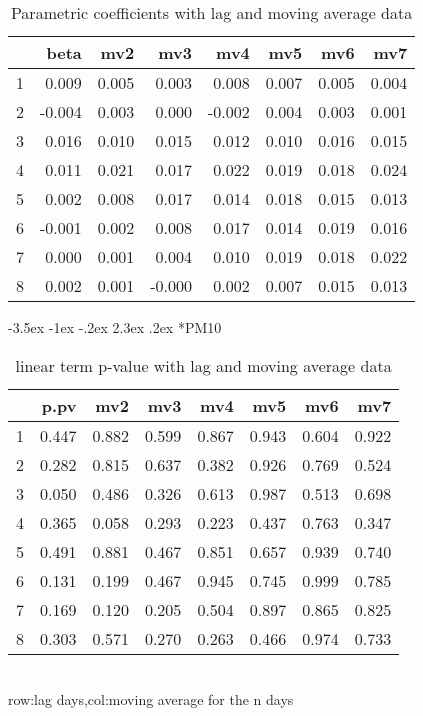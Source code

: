 \documentclass[a4paper, 12pt]{article}
\makeatletter
\def\large{\fontsize{14}{20}\selectfont}
\renewcommand\subsection{\@startsection {subsection}{1}{\z@}%
                                   {-3.5ex \@plus -1ex \@minus -.2ex}%
                                   {2.3ex \@plus.2ex}%
                                   {\centering\normalfont\large\bfseries}}
\makeatother
\begin{document}
\begin{table}[h]
\centering
\caption{Parametric coefficients with lag and moving average data}
\begin{tabular}{rrrrrrrr}
  \hline
 & beta & mv2 & mv3 & mv4 & mv5 & mv6 & mv7 \\
  \hline
1 & 0.009 & 0.005 & 0.003 & 0.008 & 0.007 & 0.005 & 0.004 \\
  2 & -0.004 & 0.003 & 0.000 & -0.002 & 0.004 & 0.003 & 0.001 \\
  3 & 0.016 & 0.010 & 0.015 & 0.012 & 0.010 & 0.016 & 0.015 \\
  4 & 0.011 & 0.021 & 0.017 & 0.022 & 0.019 & 0.018 & 0.024 \\
  5 & 0.002 & 0.008 & 0.017 & 0.014 & 0.018 & 0.015 & 0.013 \\
  6 & -0.001 & 0.002 & 0.008 & 0.017 & 0.014 & 0.019 & 0.016 \\
  7 & 0.000 & 0.001 & 0.004 & 0.010 & 0.019 & 0.018 & 0.022 \\
  8 & 0.002 & 0.001 & -0.000 & 0.002 & 0.007 & 0.015 & 0.013 \\
   \hline
\end{tabular}
\end{table}
\clearpage
\subsection*{PM10}
\begin{table}[h]
\centering
\caption{linear term p-value with lag and moving average data}
\begin{tabular}{rrrrrrrr}
  \hline
 & p.pv & mv2 & mv3 & mv4 & mv5 & mv6 & mv7 \\
  \hline
1 & 0.447 & 0.882 & 0.599 & 0.867 & 0.943 & 0.604 & 0.922 \\
  2 & 0.282 & 0.815 & 0.637 & 0.382 & 0.926 & 0.769 & 0.524 \\
  3 & 0.050 & 0.486 & 0.326 & 0.613 & 0.987 & 0.513 & 0.698 \\
  4 & 0.365 & 0.058 & 0.293 & 0.223 & 0.437 & 0.763 & 0.347 \\
  5 & 0.491 & 0.881 & 0.467 & 0.851 & 0.657 & 0.939 & 0.740 \\
  6 & 0.131 & 0.199 & 0.467 & 0.945 & 0.745 & 0.999 & 0.785 \\
  7 & 0.169 & 0.120 & 0.205 & 0.504 & 0.897 & 0.865 & 0.825 \\
  8 & 0.303 & 0.571 & 0.270 & 0.263 & 0.466 & 0.974 & 0.733 \\
   \hline
\end{tabular}
\\row:lag days,col:moving average for the n days
\end{table}
\end{document}
